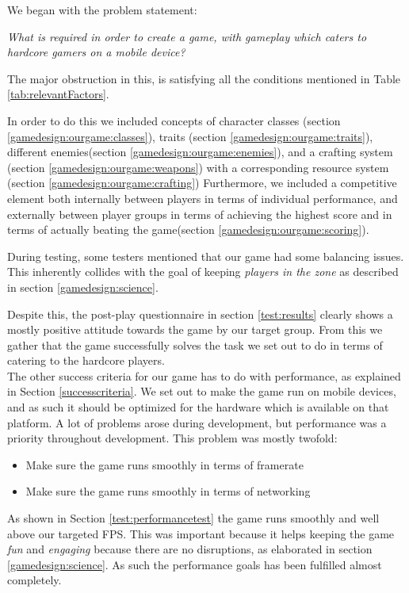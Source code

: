 We began with the problem statement:
\begin{center}
\textit{What is required in order to create a game, with gameplay which caters to hardcore gamers on a mobile device?}
\end{center}

The major obstruction in this, is satisfying all the conditions mentioned in Table \ref{tab:relevantFactors}.

In order to do this we included concepts of character classes (section \ref{gamedesign:ourgame:classes}), traits (section \ref{gamedesign:ourgame:traits}), different enemies(section \ref{gamedesign:ourgame:enemies}), and a crafting system (section \ref{gamedesign:ourgame:weapons}) with a corresponding resource system (section \ref{gamedesign:ourgame:crafting})
Furthermore, we included a competitive element both internally between players in terms of individual performance, and externally between player groups in terms of achieving the highest score and in terms of actually beating the game(section \ref{gamedesign:ourgame:scoring}).

During testing, some testers mentioned that our game had some balancing issues. 
This inherently collides with the goal of keeping \emph{players in the zone} as described in section \ref{gamedesign:science}. 

Despite this, the post-play questionnaire in section \ref{test:results} clearly shows a mostly positive attitude towards the game by our target group.
From this we gather that the game successfully solves the task we set out to do in terms of catering to the hardcore players.\\

The other success criteria for our game has to do with performance, as explained in Section \ref{successcriteria}.
We set out to make the game run on mobile devices, and as such it should be optimized for the hardware which is available on that platform. 
A lot of problems arose during development, but performance was a priority throughout development. 
This problem was mostly twofold:

\begin{itemize}
\item Make sure the game runs smoothly in terms of framerate 
\item Make sure the game runs smoothly in terms of networking
\end{itemize}

As shown in Section \ref{test:performancetest} the game runs smoothly and well above our targeted FPS.
This was important because it helps keeping the game \emph{fun} and \emph{engaging} because there are no disruptions, as elaborated in section \ref{gamedesign:science}.
As such the performance goals has been fulfilled almost completely.